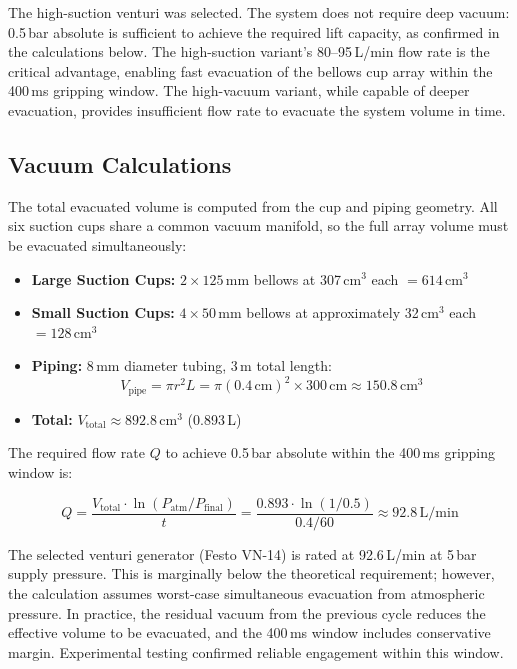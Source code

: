 The high-suction venturi was selected. The system does not require deep 
vacuum: 0.5\,bar absolute is sufficient to achieve the required lift 
capacity, as confirmed in the calculations below. The high-suction 
variant's 80--95\,L/min flow rate is the critical advantage, enabling 
fast evacuation of the bellows cup array within the 400\,ms gripping 
window. The high-vacuum variant, while capable of deeper evacuation, 
provides insufficient flow rate to evacuate the system volume in time.

\subsection{Vacuum Calculations}

The total evacuated volume is computed from the cup and piping geometry. 
All six suction cups share a common vacuum manifold, so the full array 
volume must be evacuated simultaneously:

\begin{itemize}
    \item \textbf{Large Suction Cups:} $2 \times 125$\,mm bellows at 
        307\,cm$^3$ each $= 614$\,cm$^3$
    \item \textbf{Small Suction Cups:} $4 \times 50$\,mm bellows at 
        approximately 32\,cm$^3$ each $= 128$\,cm$^3$
    \item \textbf{Piping:} 8\,mm diameter tubing, 3\,m total length:
        $$ V_{\text{pipe}} = \pi r^2 L = \pi (0.4\,\text{cm})^2 
        \times 300\,\text{cm} \approx 150.8\,\text{cm}^3 $$
    \item \textbf{Total:} $V_{\text{total}} \approx 892.8$\,cm$^3$ 
        (0.893\,L)
\end{itemize}

The required flow rate $Q$ to achieve 0.5\,bar absolute within the 
400\,ms gripping window is:

$$ Q = \frac{V_{\text{total}} \cdot \ln(P_{\text{atm}}/P_{\text{final}})}{t} 
= \frac{0.893 \cdot \ln(1/0.5)}{0.4/60} \approx 92.8\,\text{L/min} $$

The selected venturi generator (Festo VN-14) is rated at 92.6\,L/min at 
5\,bar supply pressure. This is marginally below the theoretical requirement; 
however, the calculation assumes worst-case simultaneous evacuation from 
atmospheric pressure. In practice, the residual vacuum from the previous 
cycle reduces the effective volume to be evacuated, and the 400\,ms window 
includes conservative margin. Experimental testing confirmed reliable 
engagement within this window.

